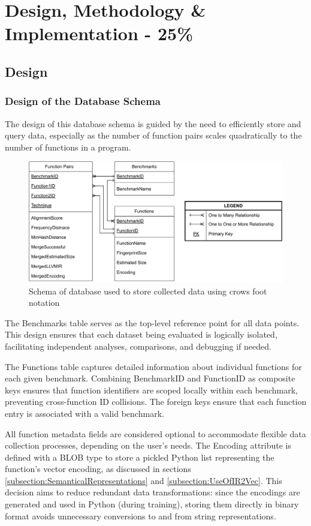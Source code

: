 \chapter{Design, Methodology \& Implementation - 25\%}

\section{Design}
\subsection{Design of the Database Schema} \label{subsection:DatabaseSchema}
The design of this database schema is guided by the need to efficiently store and query data, especially as the number of function pairs scales quadratically to the number of functions in a program.

\begin{figure}[tbh!]
\centering
\includegraphics[scale=0.85]{Figures/DataCollectionSchema.pdf}
\caption{Schema of database used to store collected data using crows foot notation}\label{fig:DatabaseSchema}
\end{figure}

The Benchmarks table serves as the top-level reference point for all data points. This design ensures that each dataset being evaluated is logically isolated, facilitating independent analyses, comparisons, and debugging if needed.

The Functions table captures detailed information about individual functions for each given benchmark. Combining BenchmarkID and FunctionID as composite keys ensures that function identifiers are scoped locally within each benchmark, preventing cross-function ID collisions. The foreign keys ensure that each function entry is associated with a valid benchmark. 

All function metadata fields are considered optional to accommodate flexible data collection processes, depending on the user's needs. The Encoding attribute is defined with a BLOB type to store a pickled Python list representing the function's vector encoding, as discussed in sections \ref{subsection:SemanticalRepresentations} and \ref{subsection:UseOfIR2Vec}. This decision aims to reduce redundant data transformations: since the encodings are generated and used in Python (during training), storing them directly in binary format avoids unnecessary conversions to and from string representations.

